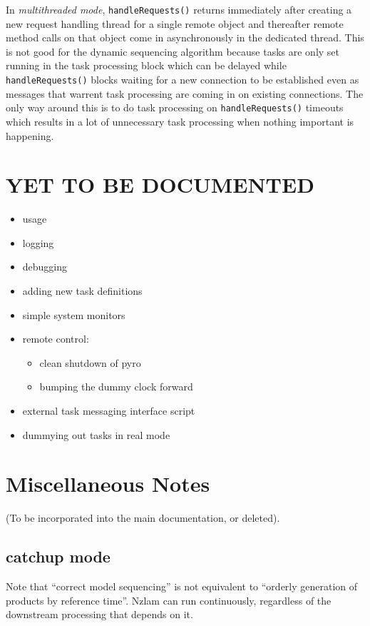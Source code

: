 \documentclass[11pt,a4paper]{report}
\begin{document}
In {\em multithreaded mode}, \verb#handleRequests()# returns immediately
after creating a new request handling thread for a single remote object
and thereafter remote method calls on that object come in asynchronously
in the dedicated thread. This is not good for the dynamic sequencing
algorithm because tasks are only set running in the task processing
block which can be delayed while \verb#handleRequests()# blocks waiting
for a new connection to be established even as messages that warrent
task processing are coming in on existing connections. The only way
around this is to do task processing on \verb#handleRequests()# timeouts
which results in a lot of unnecessary task processing when nothing
important is happening.


\chapter{YET TO BE DOCUMENTED}

\begin{itemize}
 \item usage
 \item logging
 \item debugging
 \item adding new task definitions
 \item simple system monitors
 \item remote control: 
    \begin{itemize}
    \item clean shutdown of pyro
    \item bumping the dummy clock forward
    \end{itemize}
 \item external task messaging interface script
 \item dummying out tasks in real mode
\end{itemize}

\chapter{Miscellaneous Notes}

(To be incorporated into the main documentation, or deleted).

\section{catchup mode}

Note that ``correct model sequencing'' is not equivalent to ``orderly
generation of products by reference time''.  Nzlam can run continuously,
regardless of the downstream processing that depends on it.
\end{document}
